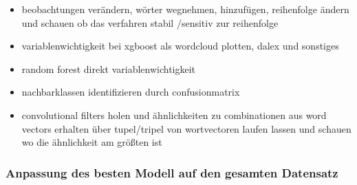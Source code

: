 \documentclass[a4paper,11pt]{article}
\begin{document}
\begin{itemize}

    \item beobachtungen verändern, wörter wegnehmen, hinzufügen, reihenfolge ändern und schauen ob das verfahren stabil /sensitiv zur reihenfolge
    \item variablenwichtigkeit bei xgboost als wordcloud plotten, dalex und sonstiges
    \item random forest direkt variablenwichtigkeit
    \item nachbarklassen identifizieren durch confusionmatrix
    \item convolutional filters holen und ähnlichkeiten zu combinationen aus word vectors erhalten über tupel/tripel von wortvectoren laufen lassen und schauen wo die ähnlichkeit am größten ist
\end{itemize}{}

\subsubsection{Anpassung des besten Modell auf den gesamten Datensatz}
\end{document}
